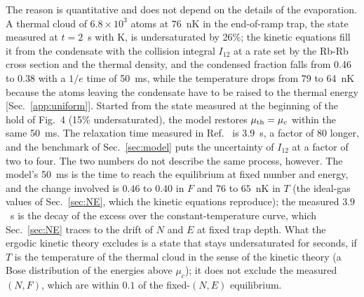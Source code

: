 The reason is quantitative and does not depend on the details of the
evaporation. A thermal cloud of $6.8\times10^3$ atoms at $76$~nK in the
end-of-ramp trap, the state measured at $t=2$~s with K, is undersaturated by
26\%; the kinetic equations fill it from the condensate with the collision
integral $I_{12}$ at a rate set by the Rb-Rb cross section and the thermal
density, and the condensed fraction falls from 0.46 to 0.38 with a $1/e$ time
of 50~ms, while the temperature drops from 79 to 64~nK because the atoms
leaving the condensate have to be raised to the thermal energy
[Sec.~\ref{app:uniform}]. Started from the state measured at the beginning of
the hold of Fig.~4 (15\% undersaturated), the model restores
$\mu_{\rm th}=\mu_c$ within the same 50~ms. The relaxation time measured in
Ref.~\cite{MelladoMunoz2020} is $3.9$~s, a factor of 80 longer, and the
benchmark of Sec.~\ref{sec:model} puts the uncertainty of $I_{12}$ at a
factor of two to four. The two numbers do not describe the same process,
however. The model's 50~ms is the time to reach the equilibrium at fixed
number and energy, and the change involved is $0.46$ to $0.40$ in $F$ and
$76$ to $65$~nK in $T$ (the ideal-gas values of Sec.~\ref{sec:NE}, which
the kinetic equations reproduce); the measured $3.9$~s is the decay of the
excess over the constant-temperature curve, which Sec.~\ref{sec:NE} traces
to the drift of $N$ and $E$ at fixed trap depth. What the ergodic kinetic
theory excludes is a state that stays undersaturated for seconds, if $T$ is
the temperature of the thermal cloud in the sense of the kinetic theory (a
Bose distribution of the energies above $\mu_c$); it does not exclude the
measured $(N,F)$, which are within $0.1$ of the fixed-$(N,E)$ equilibrium.

